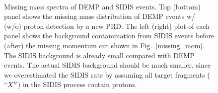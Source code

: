 \begin{figure}[!ht]
 \begin{center}
      \\
   \caption[Missing Mass]{\footnotesize{Missing mass spectra of DEMP and SIDIS
       events. Top (bottom) panel shows the missing mass distribution of DEMP
       events w/ (w/o) proton detection by a new PRD. The left (right) plot of
       each panel shows the background contamination from SIDIS events before
       (after) the missing momentum cut shown in Fig.~\ref{missing_mom}. The
       SIDIS background is already small compared with DEMP events. The actual
       SIDIS background should be much smaller, since we overestimated the
       SIDIS rate by assuming all target fragments ($``X''$) in the SIDIS process
       contain protons.}}
  \label{missing_mass}
  \end{center}
\end{figure}

